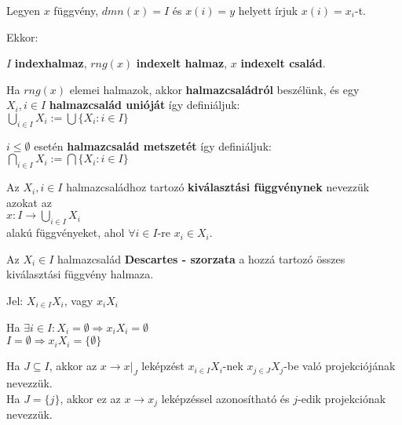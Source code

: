 \begin{frame}
\begin{tcolorbox}[title={Def.: Családok (Indexhalmaz, Indexelt halmaz, Indexelt család)}]
Legyen $x$ függvény, $dmn(x) = I$ és $x(i) = y$ helyett írjuk $x(i) = x_i$-t.\\
\mmedskip

Ekkor:\\
\msmallskip

$I$ \textbf{indexhalmaz}, $rng(x)$ \textbf{indexelt halmaz}, $x$ \textbf{indexelt család}.\\
\msmallskip

Ha $rng(x)$ elemei halmazok, akkor \textbf{halmazcsaládról} beszélünk, és egy $X_i, i \in I$ \textbf{halmazcsalád unióját} így definiáljuk:\\
${\bigcup}_{i \in I} X_i := {\bigcup}\{ X_i : i \in I\}$\\
\mmedskip

$i \leq \emptyset$ esetén \textbf{halmazcsalád metszetét} így definiáljuk:\\
${\bigcap}_{i \in I} X_i := {\bigcap}\{ X_i : i \in I\}$
\end{tcolorbox}
\end{frame}


\begin{frame}
\begin{tcolorbox}[title={Def.: Kiválasztási függvény, Halmazcsalád Descartes-szorzata}]
Az $X_i, i \in I$ halmazcsaládhoz tartozó \textbf{kiválasztási függvénynek} nevezzük azokat az\\
$x : I \rightarrow {\bigcup}_{i \in I} X_i$\\
alakú függvényeket, ahol ${\forall} i \in I$-re $x_i \in X_i$.\\
\mmedskip

Az $X_i \in I$ halmazcsalád \textbf{Descartes - szorzata} a hozzá tartozó összes kiválasztási függvény halmaza.\\
\mmedskip

Jel: $X_{i \in I} X_i$, vagy $x_iX_i$
\end{tcolorbox}

\begin{tcolorbox}[title={Ész}]
Ha ${\exists} i \in I : X_i = \emptyset \Rightarrow x_iX_i = \emptyset$\\
$I = \emptyset \Rightarrow x_iX_i = \{ \emptyset \}$
\end{tcolorbox}

\begin{tcolorbox}[title={Def.: Leképzás $j$-edik projekciója}]
Ha $J \subseteq I$, akkor az $x \rightarrow x|_J$ leképzést $x_{i \in I}X_i$-nek $x_{j \in J}X_j$-be való projekciójának nevezzük.\\
Ha $J = \{ j \}$, akkor ez az $x \rightarrow x_j$ leképzéssel azonosítható és $j$-edik projekciónak nevezzük.
\end{tcolorbox}
\end{frame}

